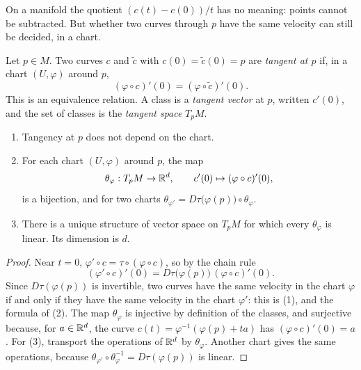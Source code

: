 \begin{notechapter}
On a manifold the quotient $(c(t) - c(0))/t$ has no meaning: points
cannot be subtracted. But whether two curves through $p$ have the same
velocity can still be decided, in a chart.

\begin{definition}\label{tangent-bundles:def:tangent}
Let $p\in M$. Two curves $c$ and $\tilde c$ with $c(0) = \tilde c(0) = p$
are \emph{tangent at $p$} if, in a chart $(U, \varphi)$ around $p$,
\[
  (\varphi\circ c)'(0) = (\varphi\circ\tilde c)'(0) .
\]
This is an equivalence relation. A class is a \emph{tangent vector} at
$p$, written $c'(0)$, and the set of classes is the \emph{tangent space}
$T_pM$.
\end{definition}

\begin{theorem}\label{tangent-bundles:thm:tangent}
\begin{enumerate}[nosep]
  \item Tangency at $p$ does not depend on the chart.
  \item For each chart $(U, \varphi)$ around $p$, the map
        \[
          \theta_\varphi:T_pM\to\mathbb{R}^d , \qquad
          c'(0)\mapsto(\varphi\circ c)'(0) ,
        \]
        is a bijection, and for two charts
        $\theta_{\varphi'} = D\tau\bigl(\varphi(p)\bigr)\circ\theta_\varphi$.
  \item There is a unique structure of vector space on $T_pM$ for which
        every $\theta_\varphi$ is linear. Its dimension is $d$.
\end{enumerate}
\end{theorem}

\begin{proof}
Near $t = 0$, $\varphi'\circ c = \tau\circ(\varphi\circ c)$, so by the
chain rule
\[
  (\varphi'\circ c)'(0)
  = D\tau\bigl(\varphi(p)\bigr)\,(\varphi\circ c)'(0) .
\]
Since $D\tau(\varphi(p))$ is invertible, two curves have the same
velocity in the chart $\varphi$ if and only if they have the same
velocity in the chart $\varphi'$: this is (1), and the formula of (2).
The map $\theta_\varphi$ is injective by definition of the classes, and
surjective because, for $a\in\mathbb{R}^d$, the curve
$c(t) = \varphi^{-1}(\varphi(p) + ta)$ has $(\varphi\circ c)'(0) = a$.
For (3), transport the operations of $\mathbb{R}^d$ by $\theta_\varphi$. Another
chart gives the same operations, because
$\theta_{\varphi'}\circ\theta_\varphi^{-1} = D\tau(\varphi(p))$ is
linear.
\end{proof}


\end{notechapter}
